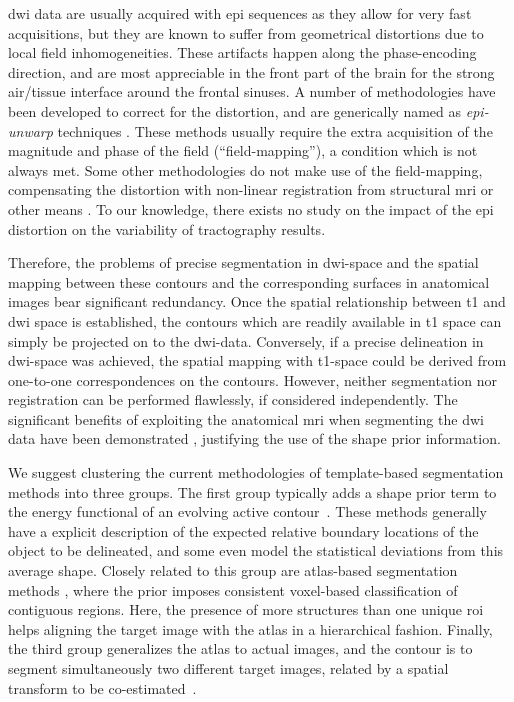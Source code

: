 \gls{dwi} data are usually acquired with \gls{epi} sequences 
as they allow for very fast acquisitions, but they are known to 
suffer from geometrical distortions due to local field inhomogeneities. 
These artifacts happen along the phase-encoding direction, and are most 
appreciable in the front part of the brain for the strong air/tissue 
interface around the frontal sinuses. A number of methodologies have
been developed to correct for the distortion, and are generically named 
as \emph{\gls{epi}-unwarp} techniques
\cite{holland_efficient_2010,hsu_correction_2009,jezzard_characterization_2005,
reber_correction_2005}. These methods usually 
require the extra acquisition of the magnitude and phase of
the field (``field-mapping''), a condition which is not always met. Some other 
methodologies do not make use of the field-mapping, compensating the distortion
with non-linear registration from structural \gls{mri} or other means
\citep{andersson_modeling_2001}. To our knowledge, there exists no study
on the impact of the \gls{epi} distortion on the variability of tractography
results. 

Therefore, the problems of precise segmentation in \gls{dwi}-space and the 
spatial mapping between these contours and the corresponding surfaces in 
anatomical images bear significant redundancy. Once the spatial relationship 
between \gls{t1} and \gls{dwi} space is established, the contours which are 
readily available in \gls{t1} space can simply be projected on to the 
\gls{dwi}-data. Conversely, if a precise delineation in \gls{dwi}-space 
was achieved, the spatial mapping with \gls{t1}-space could be derived 
from one-to-one correspondences on the contours. However, neither segmentation 
nor registration can be performed flawlessly, if considered independently. 
The significant benefits of exploiting the anatomical \gls{mri} when 
segmenting the \gls{dwi} data have been demonstrated \cite{zollei_improved_2010}, 
justifying the use of the shape prior information. 

We suggest clustering the current methodologies of template-based segmentation 
methods into three groups. The first group typically adds a shape prior term to 
the energy functional of an evolving active contour~\citep{Bresson2006a,Chan2005,
Chen2002,Cremers2006,Gastaud2004,Paragios2003,Vemuri2003a,Yezzi2003a}.
These methods generally have a explicit description of the expected relative boundary 
locations of the object to be delineated, and some even model the statistical deviations
from this average shape. Closely related to this group are atlas-based segmentation
methods \citep{Gorthi2011,Gorthi2009,Pohl2005,Pohl2006,Wang2006}, where the prior 
imposes consistent voxel-based classification of contiguous regions. Here, the 
presence of more structures than one unique \gls{roi} helps aligning the target image 
with the atlas in a hierarchical fashion. Finally, the third group generalizes 
the atlas to actual images, and the contour is to segment simultaneously two 
different target images, related by a spatial transform to be co-estimated~\citep{Wyatt2003,
Yezzi2003}.

